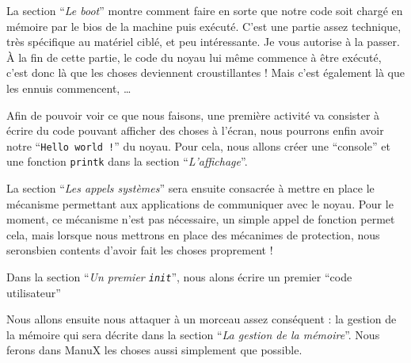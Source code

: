    La section ``{\em Le boot}'' montre comment faire en sorte que notre
code soit chargé en mémoire par le {\sc bios} de la machine puis
exécuté. C'est une partie assez technique, très spécifique au matériel
ciblé, et peu intéressante. Je vous autorise à la passer. À la fin de
cette partie, le code du noyau lui même commence à être exécuté, c'est
donc là que les choses deviennent croustillantes ! Mais c'est
également là que les ennuis commencent, \ldots

   Afin de pouvoir voir ce que nous faisons, une première activité va
consister à écrire du code pouvant afficher des choses à l'écran, nous
pourrons enfin avoir notre ``{\tt Hello world !}'' du noyau. Pour
cela, nous allons créer une ``console'' et une fonction
\lstinline!printk! dans la section ``{\em L'affichage}''.

   La section ``{\em Les appels systèmes}'' sera ensuite consacrée à
mettre en place le mécanisme permettant aux applications de
communiquer avec le noyau. Pour le moment, ce mécanisme n'est pas
nécessaire, un simple appel de fonction permet cela, mais lorsque nous
mettrons en place des mécanimes de protection, nous seronsbien
contents d'avoir fait les choses proprement !

   Dans la section ``{\em Un premier {\tt init}}'', nous alons écrire
un premier ``code utilisateur''

   Nous allons ensuite nous attaquer à un morceau assez conséquent :
la gestion de la mémoire qui sera décrite dans la section ``{\em La
  gestion de la mémoire}''. Nous ferons dans ManuX les choses aussi
simplement que possible. 
   
